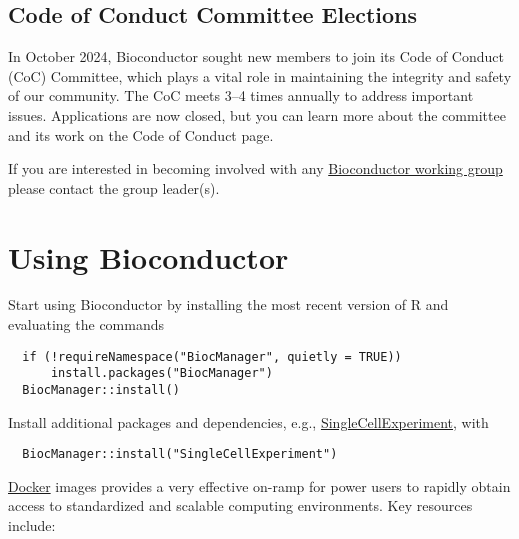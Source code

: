 \hypertarget{code-of-conduct-committee-elections}{%
\subsection{Code of Conduct Committee Elections}\label{code-of-conduct-committee-elections}}

In October 2024, Bioconductor sought new members to join its Code of Conduct (CoC) Committee, which plays a vital role in maintaining the integrity and safety of our community. The CoC meets 3--4 times annually to address important issues. Applications are now closed, but you can learn more about the committee and its work on the Code of Conduct page.

If you are interested in becoming involved with any \href{https://workinggroups.bioconductor.org/currently-active-working-groups-committees.html}{Bioconductor working group} please contact the group leader(s).

\hypertarget{using-bioconductor}{%
\section{Using Bioconductor}\label{using-bioconductor}}

Start using
Bioconductor by installing the most recent version of R and evaluating
the commands

\begin{verbatim}
  if (!requireNamespace("BiocManager", quietly = TRUE))
      install.packages("BiocManager")
  BiocManager::install()
\end{verbatim}

Install additional packages and dependencies,
e.g., \href{https://bioconductor.org/packages/SingleCellExperiment}{SingleCellExperiment}, with

\begin{verbatim}
  BiocManager::install("SingleCellExperiment")
\end{verbatim}

\href{https://bioconductor.org/help/docker/}{Docker}
images provides a very effective on-ramp for power users to rapidly
obtain access to standardized and scalable computing environments.
Key resources include:

